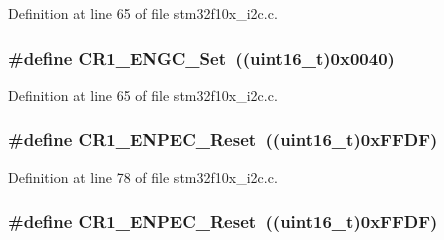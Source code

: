 Definition at line 65 of file stm32f10x\+\_\+i2c.\+c.

\subsubsection[{\texorpdfstring{C\+R1\+\_\+\+E\+N\+G\+C\+\_\+\+Set}{CR1_ENGC_Set}}]{\setlength{\rightskip}{0pt plus 5cm}\#define C\+R1\+\_\+\+E\+N\+G\+C\+\_\+\+Set~(({\bf uint16\+\_\+t})0x0040)}\hypertarget{group___i2_c___private___defines_gadcd99a681046a2315f4bc72c9f461f0e}{}\label{group___i2_c___private___defines_gadcd99a681046a2315f4bc72c9f461f0e}


Definition at line 65 of file stm32f10x\+\_\+i2c.\+c.

\subsubsection[{\texorpdfstring{C\+R1\+\_\+\+E\+N\+P\+E\+C\+\_\+\+Reset}{CR1_ENPEC_Reset}}]{\setlength{\rightskip}{0pt plus 5cm}\#define C\+R1\+\_\+\+E\+N\+P\+E\+C\+\_\+\+Reset~(({\bf uint16\+\_\+t})0x\+F\+F\+D\+F)}\hypertarget{group___i2_c___private___defines_gabd33104d7b8e4673fa330f4ca3a97e44}{}\label{group___i2_c___private___defines_gabd33104d7b8e4673fa330f4ca3a97e44}


Definition at line 78 of file stm32f10x\+\_\+i2c.\+c.

\subsubsection[{\texorpdfstring{C\+R1\+\_\+\+E\+N\+P\+E\+C\+\_\+\+Reset}{CR1_ENPEC_Reset}}]{\setlength{\rightskip}{0pt plus 5cm}\#define C\+R1\+\_\+\+E\+N\+P\+E\+C\+\_\+\+Reset~(({\bf uint16\+\_\+t})0x\+F\+F\+D\+F)}\hypertarget{group___i2_c___private___defines_gabd33104d7b8e4673fa330f4ca3a97e44}{}\label{group___i2_c___private___defines_gabd33104d7b8e4673fa330f4ca3a97e44}


